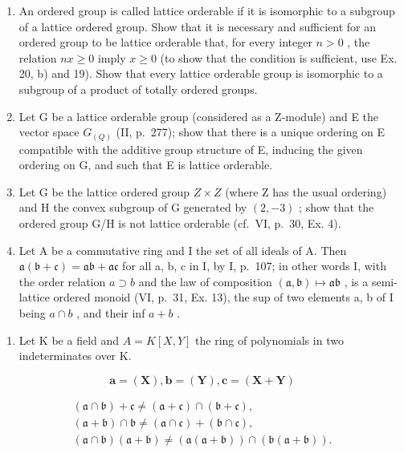 \begin{enumerate}
\def\labelenumi{\arabic{enumi})}
\setcounter{enumi}{20}
\item
  An ordered group is called lattice orderable if it is isomorphic to a subgroup of a lattice ordered group. Show that it is necessary and sufficient for an ordered group to be lattice orderable that, for every integer \(n > 0\) , the relation \(nx \geqslant 0\) imply \(x \geqslant 0\) (to show that the condition is sufficient, use Ex. 20, b) and 19). Show that every lattice orderable group is isomorphic to a subgroup of a product of totally ordered groups.
\item
  Let G be a lattice orderable group (considered as a Z-module) and E the vector space \(G_{(Q)}\) (II, p.~277); show that there is a unique ordering on E compatible with the additive group structure of E, inducing the given ordering on G, and such that E is lattice orderable.
\item
  Let G be the lattice ordered group \(Z \times Z\) (where Z has the usual ordering) and H the convex subgroup of G generated by \((2, -3)\) ; show that the ordered group G/H is not lattice orderable (cf.~VI, p.~30, Ex. 4).
\item
  Let A be a commutative ring and I the set of all ideals of A. Then \(\mathfrak{a}(\mathfrak{b} + \mathfrak{c}) = \mathfrak{a}\mathfrak{b} + \mathfrak{a}\mathfrak{c}\) for all a, b, c in I, by I, p.~107; in other words I, with the order relation \(a \supset b\) and the law of composition \((\mathfrak{a}, \mathfrak{b}) \mapsto \mathfrak{a}\mathfrak{b}\) , is a semi-lattice ordered monoid (VI, p.~31, Ex. 13), the sup of two elements a, b of I being \(a \cap b\) , and their inf \(a + b\) .
\end{enumerate}

\begin{enumerate}
\def\labelenumi{\alph{enumi})}
\tightlist
\item
  Let K be a field and \(A = K[X, Y]\) the ring of polynomials in two indeterminates over K.
\end{enumerate}

\[
\mathbf {a} = (\mathbf {X}), \mathbf {b} = (\mathbf {Y}), \mathbf {c} = (\mathbf {X} + \mathbf {Y})
\]

\[
\begin{array}{c} (\mathfrak {a} \cap \mathfrak {b}) + \mathfrak {c} \neq (\mathfrak {a} + \mathfrak {c}) \cap (\mathfrak {b} + \mathfrak {c}), \\ (\mathfrak {a} + \mathfrak {b}) \cap \mathfrak {b} \neq (\mathfrak {a} \cap \mathfrak {c}) + (\mathfrak {b} \cap \mathfrak {c}), \\ (\mathfrak {a} \cap \mathfrak {b}) (\mathfrak {a} + \mathfrak {b}) \neq (\mathfrak {a} (\mathfrak {a} + \mathfrak {b})) \cap (\mathfrak {b} (\mathfrak {a} + \mathfrak {b})). \end{array}
\]

